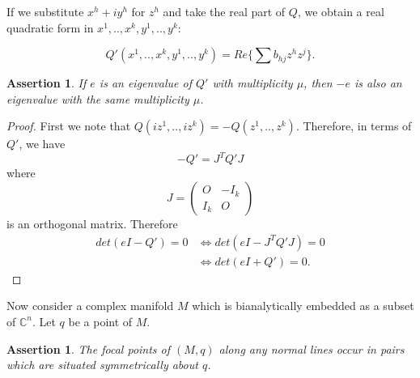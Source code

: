 \documentclass[a4paper,11pt,reqno]{amsart}
\newtheorem{asser}[thm]{Assertion}
\newcommand{\CC}{\mathbb{C}}
\begin{document}
If we substitute $x^h+iy^h$ for $z^h$ and take the real part of $Q$, we obtain a
real quadratic form in $x^1, .., x^k, y^1, .., y^k$:

\begin{equation}
  Q'(x^1, .., x^k, y^1, .., y^k) = Re\{\sum b_{hj}z^hz^j\}.
\end{equation}

\begin{asser}
  If $e$ is an eigenvalue of $Q'$ with multiplicity $\mu$, then $-e$ is also an
  eigenvalue with the same multiplicity $\mu$.
\end{asser}

\begin{proof}
  First we note that $Q(iz^1, .., iz^k) = -Q(z^1, .., z^k)$. Therefore, in terms
  of $Q'$, we have
  \begin{equation}
    -Q' = J^TQ'J
  \end{equation}
  where
  \begin{equation}
    J = 
    \left(
      \begin{matrix}
        O & -I_k \\
        I_k & O
      \end{matrix}
    \right)
  \end{equation}
  is an orthogonal matrix. Therefore
  \begin{equation}
    \begin{aligned}
      det(eI-Q') = 0 &\Leftrightarrow det(eI-J^TQ'J) = 0 \\
      &\Leftrightarrow det(eI+Q') = 0.      
    \end{aligned}
  \end{equation}
\end{proof}

Now consider a complex manifold $M$ which is bianalytically embedded as a subset
of $\CC^n$. Let $q$ be a point of $M$.

\begin{asser}
  The focal points of $(M, q)$ along any normal lines occur in pairs
  which are situated symmetrically about $q$.
\end{asser}
\end{document}

